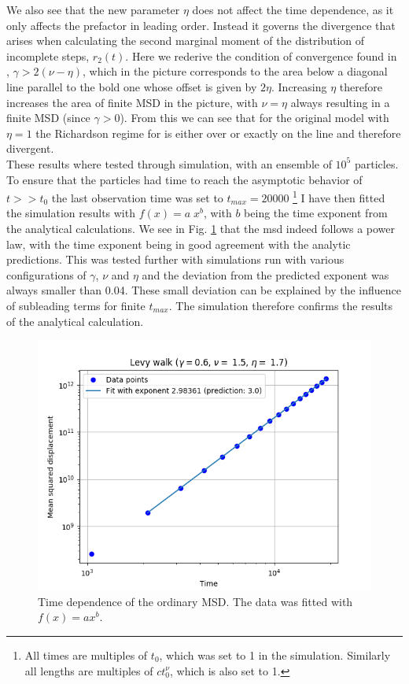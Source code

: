 We also see that the new parameter $\eta$ does not affect the time dependence, as it only affects the prefactor in leading order. Instead it governs the divergence that arises when calculating the second marginal moment of the distribution of incomplete steps, $r_2(t)$. Here we rederive the condition of convergence found in \cite{radons2018}, $\gamma > 2(\nu - \eta)$, which in the picture corresponds to the area below a diagonal line parallel to the bold one whose offset is given by $2\eta$. Increasing $\eta$ therefore increases the area of finite MSD in the picture, with $\nu=\eta$ always resulting in a finite MSD (since $\gamma >0$). From this we can see that for the original model with $\eta =1$ the Richardson regime for is either over or exactly on the line and therefore divergent. \\

These results where tested through simulation, with an ensemble of $10^5$ particles. To ensure that the particles had time to reach the asymptotic behavior of $t>>t_0$ the last observation time was set to $t_{max} = 20000$
\footnote{All times are multiples of $t_0$, which was set to 1 in the simulation. Similarly all lengths are multiples of $c t_0^{\nu}$, which is also set to 1. }
I have then fitted the simulation results with $f(x) = a \; x^b$, with $b$ being the time exponent from the analytical calculations. We see in Fig. \ref{fig:plotMSDordinary} that the \gls{msd} indeed follows a power law, with the time exponent being in good agreement with the analytic predictions. This was tested further with simulations run with various configurations of $\gamma$, $\nu$ and $\eta$ and the  deviation from the predicted exponent was always smaller than 0.04. These small deviation can be explained by the influence of subleading terms for finite $t_{max}$. The simulation therefore confirms the results of the analytical calculation.
%
\begin{figure}
\begin{center}
\includegraphics[width=120mm]{pics/plotMSDordinary.png}
\caption{Time dependence of the ordinary MSD. The data was fitted with $f(x) = ax^b$.
\label{fig:plotMSDordinary} }
\end{center}
\end{figure} 
%

